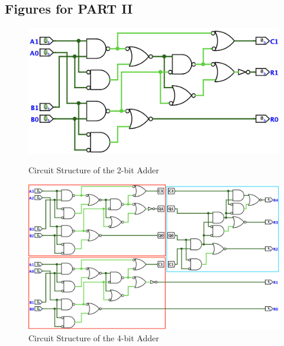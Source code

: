 \documentclass[11pt]{article}
\begin{document}
\newpage
\begin{appendix}

\section{Figures for PART II}
\label{app:a}

\begin{figure}[h!]
	\centering
	\begin{minipage}{0.48\textwidth}
		\centering
		\includegraphics[width=\textwidth]{part1third.png}
		\caption{Circuit Structure of the 2-bit Adder}
		\label{fig:2bit_adder}
	\end{minipage}
	\hfill
	\begin{minipage}{0.48\textwidth}
		\centering
		\includegraphics[width=\textwidth]{Part2.png}
		\caption{Circuit Structure of the 4-bit Adder}
		\label{fig:4bit_adder}
	\end{minipage}
\end{figure}


\end{appendix}
\end{document}
